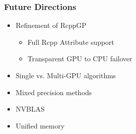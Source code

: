 \documentclass[t]{beamer}\usepackage[]{graphicx}\usepackage[]{color}
\begin{document}

\begin{frame}
\frametitle{Future Directions}
    
\begin{itemize}

\item Refinement of RcppGP

\vspace{1mm}
\begin{itemize}
  \item Full Rcpp Attribute support
  \item Transparent GPU to CPU failover
\end{itemize}
\vspace{1mm}

\item Single vs. Multi-GPU algorithms

\vspace{2mm}

\item Mixed precision methods

\vspace{2mm}

\item NVBLAS

\vspace{2mm}

\item Unified memory

\end{itemize}


\end{frame}


\end{document}
